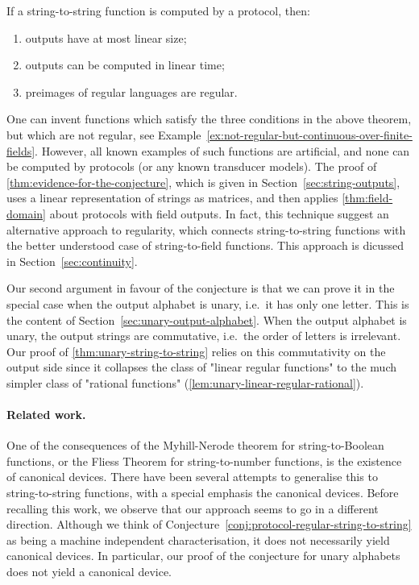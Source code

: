 \begin{theorem}\label{thm:evidence-for-the-conjecture}
    If a string-to-string function  is  computed by a protocol, then:
    \begin{enumerate}
        \item \label{it:linear-size-outputs} outputs have at most linear size;
        \item \label{it:linear-time-computable} outputs can be   computed in linear time;
        \item \label{it:regular-preimages} preimages of regular languages are regular.
    \end{enumerate}
\end{theorem}

One can invent functions which satisfy the three conditions in the above theorem, but which are not regular, see Example~\ref{ex:not-regular-but-continuous-over-finite-fields}. However, all known examples of such functions  are artificial, and none can be computed by protocols (or any known transducer models).  The proof of \cref{thm:evidence-for-the-conjecture}, which is given in Section~\ref{sec:string-outputs}, uses a linear representation of strings as matrices, and then applies \cref{thm:field-domain} about protocols with field outputs. In fact, this technique suggest an alternative approach to regularity,  which connects string-to-string functions with the better understood case of string-to-field functions. This approach is dicussed in Section~\ref{sec:continuity}.

Our second argument in favour of  the conjecture is that we can prove it in the
special case when the output alphabet is unary, i.e.~it has only one letter.
This is the content of Section~\ref{sec:unary-output-alphabet}. When the output
alphabet is unary, the output strings are commutative, i.e.~the order of
letters is irrelevant. Our proof of \cref{thm:unary-string-to-string}
relies on this commutativity on the output side since it collapses
the class of "linear regular functions" to the much simpler class of
"rational functions" (\cref{lem:unary-linear-regular-rational}).

\paragraph*{Related work.} One of the consequences of the Myhill-Nerode theorem for string-to-Boolean functions, or the Fliess Theorem for string-to-number functions, is the existence of  canonical devices. There have been several attempts to generalise this to string-to-string functions, with a special emphasis the canonical devices. Before recalling this work, we observe that our approach seems to go in a  different direction. Although we think of Conjecture~\ref{conj:protocol-regular-string-to-string} as being a machine independent characterisation, it does not necessarily  yield canonical devices. In particular, our proof of the conjecture for unary alphabets does not yield a canonical device.

